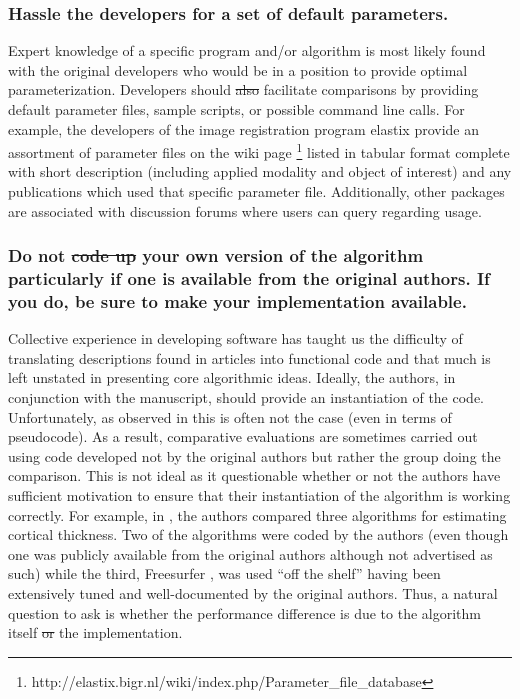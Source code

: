 \documentclass[final,5p,times,twocolumn]{elsarticle}
\newcommand{\trEdit}[1]{{\color{blue}{#1}}}
\newcommand{\trDelete}[1]{{\color{blue}\sout{#1}}}
\begin{document}
\subsubsection{Hassle the developers for a set of default parameters.}
Expert knowledge of a specific program and/or algorithm is most
likely found with the original developers who would be in a position to
provide optimal parameterization.
Developers should \trDelete{also}\trEdit{actively} facilitate
comparisons by providing default parameter files, sample scripts, 
or possible command line calls.  For example, the developers of
the image registration program elastix \cite{klein2010} provide an
assortment of parameter files on the wiki page%
\footnote{
  http://elastix.bigr.nl/wiki/index.php/Parameter\_file\_database
}
listed in tabular format complete with  short
description (including applied modality and object of interest) and 
any publications which used that specific parameter file.  Additionally,
other packages are associated with discussion forums where users can
query regarding usage.

\subsubsection{Do not \trDelete{code up}\trEdit{implement} your own version of the algorithm particularly 
if one is available from the original authors.  If you do, be sure to make
your implementation available.}

Collective experience in developing software has taught us the 
difficulty of translating descriptions found in
articles into functional code and that much is left unstated
in presenting core algorithmic ideas.  Ideally, the authors,
in conjunction with the manuscript, should provide an instantiation
of the code.  Unfortunately, as observed in \cite{kovacevic2006}
this is often not the case (even in terms of pseudocode).
As a result, comparative evaluations are sometimes carried out using 
code developed not by the original authors but rather the 
group doing the comparison.  This is not ideal as it \trEdit{is} questionable
whether or not the authors have sufficient motivation to ensure that
their instantiation of the algorithm is working correctly. For
example, in \cite{clarkson2011}, the authors compared three algorithms
for estimating cortical thickness.  Two of the algorithms were
coded by the authors (even though one was publicly available from 
the original authors although not advertised as such) while the third, 
Freesurfer \cite{fischl2012}, was used ``off the shelf'' having been extensively 
tuned and well-documented by the original authors.  
Thus, a natural question to ask is whether the performance difference
is due to the algorithm itself\trEdit{,} \trDelete{or} the implementation\trEdit{, or the parameter tuning}.
\end{document}
